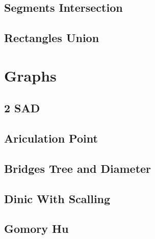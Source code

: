 \subsection{Segments Intersection}
\vspace{-2ex}
\raggedbottom
\vspace{-3.2ex}
\hrulefill
\subsection{Rectangles Union}
\vspace{-2ex}
\raggedbottom
\vspace{-3.2ex}
\hrulefill

\section{Graphs}
\subsection{2 SAD}
\vspace{-2ex}
\raggedbottom
\vspace{-3.2ex}
\hrulefill
\subsection{Ariculation Point}
\vspace{-2ex}
\raggedbottom
\vspace{-3.2ex}
\hrulefill
\subsection{Bridges Tree and Diameter}
\vspace{-2ex}
\raggedbottom
\vspace{-3.2ex}
\hrulefill
\subsection{Dinic With Scalling}
\vspace{-2ex}
\raggedbottom
\vspace{-3.2ex}
\hrulefill
\subsection{Gomory Hu}
\vspace{-2ex}
\raggedbottom
\vspace{-3.2ex}
\hrulefill
